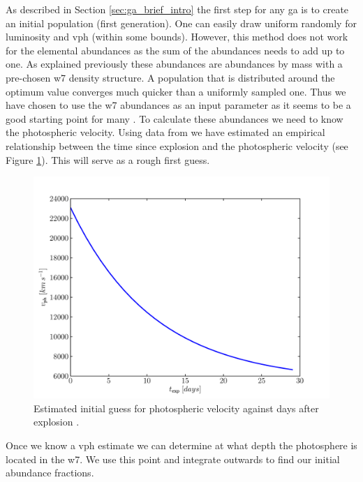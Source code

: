 As described in Section \ref{sec:ga_brief_intro} the first step for any \gls{ga} is to create an initial population (first generation). One can easily draw uniform randomly for luminosity and \gls{vph} (within some bounds). However, this method does not work for the elemental abundances as the sum of the abundances needs to add up to one. As explained previously these abundances are abundances by mass with a pre-chosen \gls{w7} density structure. A population that is distributed around the optimum value converges much quicker than a uniformly sampled one. Thus we have chosen to use the \gls{w7} abundances as an input parameter as it seems to be a good starting point for many \snia. To calculate these abundances we need to know the photospheric velocity. Using data from \citet{2005ApJ...623.1011B} we have estimated an empirical relationship between the time since explosion and the photospheric velocity (see Figure \ref{fig:texp_vph}). This will serve as a rough first guess.

\begin{figure}[htbp] %
   \centering
   \includegraphics[width=\textwidth]{chapter_dalek/plots/plot_texp_vph.pdf} 
   \caption[Estimated initial guess for photospheric velocity against days after explosion]{Estimated initial guess for photospheric velocity against days after explosion \citep{2005ApJ...623.1011B}. }
   \label{fig:texp_vph}
\end{figure} 

Once we know a \gls{vph} estimate we can determine at what depth the photosphere is located in the \gls{w7}. We use this point and integrate outwards to find our initial abundance fractions.

